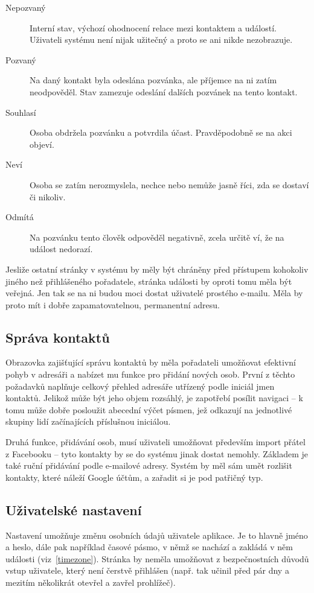 \documentclass[12pt,oneside,final]{fithesis2}
\begin{document}
\begin{description}
    \item[Nepozvaný] Interní stav, výchozí ohodnocení relace mezi kontaktem a událostí. Uživateli systému není nijak užitečný a proto se ani nikde nezobrazuje.
    \item[Pozvaný] Na daný kontakt byla odeslána pozvánka, ale příjemce na ni zatím neodpověděl. Stav zamezuje odeslání dalších pozvánek na tento kontakt.
    \item[Souhlasí] Osoba obdržela pozvánku a potvrdila účast. Pravděpodobně se na akci objeví.
    \item[Neví] Osoba se zatím nerozmyslela, nechce nebo nemůže jasně říci, zda se dostaví či nikoliv.
    \item[Odmítá] Na pozvánku tento člověk odpověděl negativně, zcela určitě ví, že na událost nedorazí.
\end{description}

Jesliže ostatní stránky v systému by měly být chráněny před přístupem kohokoliv jiného než přihlášeného pořadatele, stránka události by oproti tomu měla být veřejná. Jen tak se na ni budou moci dostat uživatelé prostého e-mailu. Měla by proto mít i dobře zapamatovatelnou, permanentní adresu.

\subsection{Správa kontaktů}
Obrazovka zajišťující správu kontaktů by měla pořadateli umožňovat efektivní pohyb v adresáři a nabízet mu funkce pro přidání nových osob. První z těchto požadavků naplňuje celkový přehled adresáře utřízený podle iniciál jmen kontaktů. Jelikož může být jeho objem rozsáhlý, je zapotřebí posílit navigaci -- k tomu může dobře posloužit abecední výčet písmen, jež odkazují na jednotlivé skupiny lidí začínajících příslušnou iniciálou.

Druhá funkce, přidávání osob, musí uživateli umožňovat především import přátel z Facebooku -- tyto kontakty by se do systému jinak dostat nemohly. Základem je také ruční přidávání podle e-mailové adresy. Systém by měl sám umět rozlišit kontakty, které náleží Google účtům, a zařadit si je pod patřičný typ.

\subsection{Uživatelské nastavení}
Nastavení umožňuje změnu osobních údajů uživatele aplikace. Je to hlavně jméno a heslo, dále pak například časové pásmo, v němž se nachází a zakládá v něm události (viz~\ref{timezone}). Stránka by neměla umožňovat z bezpečnostních důvodů vstup uživatele, který není čerstvě přihlášen (např. tak učinil před pár dny a mezitím několikrát otevřel a zavřel prohlížeč).
\end{document}
